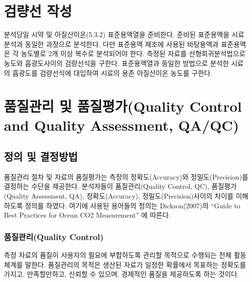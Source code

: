 \documentclass[
]{book}
\begin{document}
\hypertarget{uxac80uxb7c9uxc120-uxc791uxc131}{%
\section{검량선 작성}\label{uxac80uxb7c9uxc120-uxc791uxc131}}

분석당일 시약 및 아질산이온(5.3.2) 표준용액열을 준비한다. 준비된 표준용액을 시료분석과 동일한 과정으로 분석한다. 다만 표준용액 제조에 사용된 바탕용액과 표준용액은 각 농도별로 2개 이상 복수로 분석되어야 한다. 측정된 자료를 선형회귀분석법으로 농도와 흡광도사이의 검량선식을 구한다. 표준용액열과 동일한 방법으로 분석한 시료의 흡광도를 검량선식에 대입하여 시료의 용존 아질산이온 농도를 구한다.

\hypertarget{uxd488uxc9c8uxad00uxb9ac-uxbc0f-uxd488uxc9c8uxd3c9uxac00quality-control-and-quality-assessment-qaqc}{%
\section{품질관리 및 품질평가(Quality Control and Quality Assessment, QA/QC)}\label{uxd488uxc9c8uxad00uxb9ac-uxbc0f-uxd488uxc9c8uxd3c9uxac00quality-control-and-quality-assessment-qaqc}}

\hypertarget{uxc815uxc758-uxbc0f-uxacb0uxc815uxbc29uxbc95}{%
\subsection{정의 및 결정방법}\label{uxc815uxc758-uxbc0f-uxacb0uxc815uxbc29uxbc95}}

품질관리 절차 및 자료의 품질평가는 측정의 정확도(Accuracy)와 정밀도(Precision)를 결정하는 수단을 제공한다. 분석자들이 품질관리(Quality Control, QC), 품질평가(Quality Assessment, QA), 정확도(Accuracy), 정밀도(Precision)사이의 차이를 이해하도록 정의를 하였다. 여기에 사용된 용어들의 정의는 Dickson(2007)의 ``Guide to Best Practices for Ocean CO2 Measurement'' 에 따른다.

\hypertarget{uxd488uxc9c8uxad00uxb9acquality-control}{%
\subsubsection{품질관리(Quality Control)}\label{uxd488uxc9c8uxad00uxb9acquality-control}}

측정 자료의 품질이 사용자의 필요에 부합하도록 관리할 목적으로 수행되는 전체 활동체계를 말한다. 품질관리의 목적은 생산된 자료가 일정한 확률에서 목표하는 정확도를 가지고, 만족할만하고, 신뢰할 수 있으며, 경제적인 품질을 제공하도록 하는 것이다.
\end{document}

